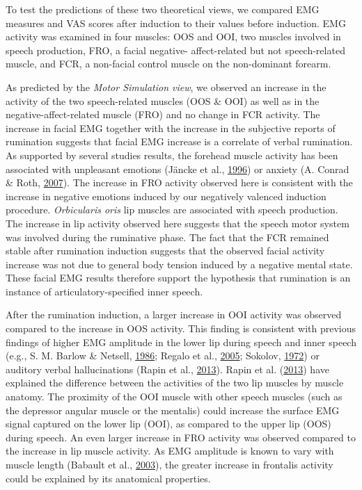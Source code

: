 \documentclass[a4paper,12pt,twoside,openright,oldfontcommands]{memoir}
\begin{document}
To test the predictions of these two theoretical views, we compared EMG
measures and VAS scores after induction to their values before
induction. EMG activity was examined in four muscles: OOS and OOI, two
muscles involved in speech production, FRO, a facial negative-
affect-related but not speech-related muscle, and FCR, a non-facial
control muscle on the non-dominant forearm.

As predicted by the \emph{Motor Simulation view}, we observed an
increase in the activity of the two speech-related muscles (OOS \& OOI)
as well as in the negative-affect-related muscle (FRO) and no change in
FCR activity. The increase in facial EMG together with the increase in
the subjective reports of rumination suggests that facial EMG increase
is a correlate of verbal rumination. As supported by several studies
results, the forehead muscle activity has been associated with
unpleasant emotions (Jäncke et al.,
\protect\hyperlink{ref-Jancke1996}{1996}) or anxiety (A. Conrad \& Roth,
\protect\hyperlink{ref-conrad_muscle_2007}{2007}). The increase in FRO
activity observed here is consistent with the increase in negative
emotions induced by our negatively valenced induction procedure.
\emph{Orbicularis oris} lip muscles are associated with speech
production. The increase in lip activity observed here suggests that the
speech motor system was involved during the ruminative phase. The fact
that the FCR remained stable after rumination induction suggests that
the observed facial activity increase was not due to general body
tension induced by a negative mental state. These facial EMG results
therefore support the hypothesis that rumination is an instance of
articulatory-specified inner speech.

After the rumination induction, a larger increase in OOI activity was
observed compared to the increase in OOS activity. This finding is
consistent with previous findings of higher EMG amplitude in the lower
lip during speech and inner speech (e.g., S. M. Barlow \& Netsell,
\protect\hyperlink{ref-barlow_differential_1986}{1986}; Regalo et al.,
\protect\hyperlink{ref-regalo_electromyographic_2005}{2005}; Sokolov,
\protect\hyperlink{ref-sokolov_inner_1972}{1972}) or auditory verbal
hallucinations (Rapin et al.,
\protect\hyperlink{ref-rapin_emg_2013}{2013}). Rapin et al.
(\protect\hyperlink{ref-rapin_emg_2013}{2013}) have explained the
difference between the activities of the two lip muscles by muscle
anatomy. The proximity of the OOI muscle with other speech muscles (such
as the depressor angular muscle or the mentalis) could increase the
surface EMG signal captured on the lower lip (OOI), as compared to the
upper lip (OOS) during speech. An even larger increase in FRO activity
was observed compared to the increase in lip muscle activity. As EMG
amplitude is known to vary with muscle length (Babault et al.,
\protect\hyperlink{ref-babault_effect_2003}{2003}), the greater increase
in frontalis activity could be explained by its anatomical properties.
\end{document}

